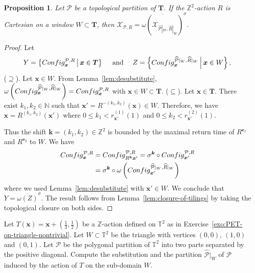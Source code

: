 \documentclass[12pt]{amsart}
\newtheorem{proposition}[definition]{Proposition}
\newcommand{\N}{\mathbb{N}}
\newcommand{\Z}{\mathbb{Z}}
\newcommand{\be}{{\boldsymbol{e}}}
\newcommand{\bk}{{\boldsymbol{k}}}
\newcommand{\bx}{{\boldsymbol{x}}}
\newcommand{\Pcal}{\mathcal{P}}
\newcommand{\Xcal}{\mathcal{X}} %
\newcommand{\shiftclosure}[1]{{\overline{#1}^{\sigma}}}
\newcommand{\generictorus}{{\boldsymbol{T}}}
\newcommand{\torus}{\mathbb{T}}
\newcommand{\scConfig}{\textsc{Config}}
\begin{document}
\begin{proposition}\label{prop:orbit-preimage}
    Let $\Pcal$ be a topological partition of $\generictorus$.
If the $\Z^2$-action $R$ is Cartesian on a window $W\subset\generictorus$,
    then $\Xcal_{\Pcal,R}=\shiftclosure{\omega(\Xcal_{\widehat{\Pcal}|_W,\widehat{R}|_W})}$.
\end{proposition}


\begin{proof}
    Let
    \[
        Y = \left\{ \scConfig^{\Pcal,R}_{\bx}\,\middle|\,
                    \bx\in\generictorus\right\}
        \quad\text{ and }\quad
        Z = \left\{ \scConfig^{\widehat{\Pcal}|_W,\widehat{R}|_W}_{\bx}
               \,\middle|\, \bx\in W\right\},
    \]
    ($\supseteq$).
        Let $\bx\in W$.
        From Lemma~\ref{lem:desubstitute},
        $\omega\left(
         \scConfig^{\widehat{\Pcal}|_W,\widehat{R}|_W}_{\bx}\right)
         = \scConfig^{\Pcal,R}_{\bx}$ with $\bx\in W\subset\generictorus$.
    ($\subseteq$).
    Let $\bx\in\generictorus$. There exist $k_1,k_2\in\N$ such that
    $\bx'=R^{-(k_1,k_2)}(\bx)\in W$. 
    Therefore, we have $\bx=R^{(k_1,k_2)}(\bx')$ where $0\leq k_1<r_{\bx'}^{(1)}(1)$ and
    $0\leq k_2<r_{\bx'}^{(2)}(1)$.

    Thus the shift $\bk=(k_1,k_2)\in\Z^2$ is bounded by the maximal return time
    of $R^{\be_1}$ and $R^{\be_2}$ to $W$. We have
    \begin{align*}
        \scConfig^{\Pcal,R}_{\bx}
        &= \scConfig^{\Pcal,R}_{R^\bk\bx'}
        = \sigma^{\bk} \circ
        \scConfig^{\Pcal,R}_{\bx'}\\
        &= \sigma^{\bk} \circ \omega
        \left(\scConfig^{\widehat{\Pcal}|_W,\widehat{R}|_W}_{\bx'}\right)
    \end{align*}
    where we used
    Lemma~\ref{lem:desubstitute} with $\bx'\in W$.
    We conclude that $Y=\shiftclosure{\omega(Z)}$.
    The result follows from Lemma~\ref{lem:closure-of-tilings}
    by taking the topological closure on both sides.
\end{proof}

\begin{exo}[label={exo:induced-partition-on-triangle}]
    Let $T(\bx) = \bx+(\frac{1}{3},\frac{1}{2})$
    be a $\Z$-action defined on $\torus^2$ as in Exercise~\ref{exo:PET-on-triangle-nontrivial}.
    Let $W\subset\torus^2$ be the triangle with vertices $(0,0)$, $(1,0)$ and
    $(0,1)$.
    Let $\Pcal$ be the polygonal partition of $\torus^2$ into two parts
    separated by the positive diagonal.
    Compute the substitution and the partition $\widehat{\Pcal}|_{W}$ of
    $\Pcal$ induced by the action of $T$ on the sub-domain $W$.
\end{exo}
\end{document}
